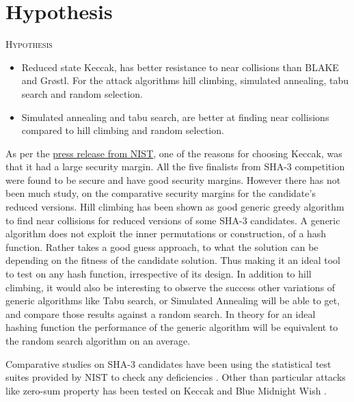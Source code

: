 \section{Hypothesis}

\begin{center}
  \framebox
  {
    \parbox{400pt}
    {
      \centering \textsc{Hypothesis} \\
      \begin{itemize}
      \item Reduced state Keccak, has better resistance to near collisions than BLAKE and Gr{\o}stl. For the
      attack algorithms hill climbing, simulated annealing, tabu search and random selection.
      \item Simulated annealing and tabu search, are better at finding near collisions compared to hill 
      climbing and random selection.
      \end{itemize}
    }
  }
\end{center}

As per the \href{"http://csrc.nist.gov/groups/ST/hash/sha-3/sha-3\_selection\_announcement.pdf"}{press release from NIST}, 
one of the reasons for choosing Keccak, was that it had a large security margin. All the five finalists from SHA-3 competition
were found to be secure and have good security margins. However there has not been much study, on the comparative security
margins for the candidate's reduced versions. Hill climbing has been shown as good generic greedy algorithm to find 
near collisions for reduced versions of some SHA-3 candidates. A generic algorithm does not exploit the inner permutations
or construction, of a hash function. Rather takes a good guess approach, to what the solution can be depending on the fitness
of the candidate solution. Thus making it an ideal tool to test on any hash function, irrespective of its design. In addition
to hill climbing, it would also be interesting to observe the success other variations of generic algorithms like Tabu search,
or Simulated Annealing will be able to get, and compare those results against a random search. In theory for an ideal hashing
function the performance of the generic algorithm will be equivalent to the random search algorithm on an average.

Comparative studies on SHA-3 candidates have been using the statistical test suites provided by NIST to check any 
deficiencies \cite{00030} \cite{00032}. Other than particular attacks like zero-sum property has been tested on 
Keccak and Blue Midnight Wish \cite{00031}.
